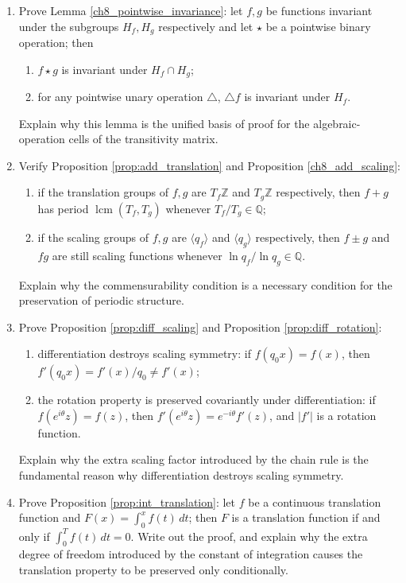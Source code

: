 \begin{enumerate}[leftmargin=3em, label=\textbf{Exercise \arabic*}]
    \item Prove Lemma \ref{ch8_pointwise_invariance}:
    let $f,g$ be functions invariant under the subgroups $H_f,H_g$ respectively
    and let $\star$ be a pointwise binary operation; then
    \begin{enumerate}[label=(\roman*)]
        \item $f\star g$ is invariant under $H_f\cap H_g$;
        \item for any pointwise unary operation $\triangle$, $\triangle f$ is invariant under $H_f$.
    \end{enumerate}
    Explain why this lemma is the unified basis of proof for the algebraic-operation cells of the transitivity matrix.

    \item Verify Proposition \ref{prop:add_translation} and Proposition \ref{ch8_add_scaling}:
    \begin{enumerate}[label=(\roman*)]
        \item if the translation groups of $f,g$ are $T_f\mathbb{Z}$ and $T_g\mathbb{Z}$ respectively,
              then $f+g$ has period $\operatorname{lcm}(T_f,T_g)$ whenever $T_f/T_g\in\mathbb{Q}$;
        \item if the scaling groups of $f,g$ are $\langle q_f\rangle$ and $\langle q_g\rangle$ respectively,
              then $f\pm g$ and $fg$ are still scaling functions whenever $\ln q_f/\ln q_g\in\mathbb{Q}$.
    \end{enumerate}
    Explain why the commensurability condition is a necessary condition for the preservation of periodic structure.

    \item Prove Proposition \ref{prop:diff_scaling} and Proposition \ref{prop:diff_rotation}:
    \begin{enumerate}[label=(\roman*)]
        \item differentiation destroys scaling symmetry: if $f(q_0x)=f(x)$, then
              $f'(q_0x)=f'(x)/q_0\neq f'(x)$;
        \item the rotation property is preserved covariantly under differentiation: if $f(e^{i\theta}z)=f(z)$, then
              $f'(e^{i\theta}z)=e^{-i\theta}f'(z)$, and $|f'|$ is a rotation function.
    \end{enumerate}
    Explain why the extra scaling factor introduced by the chain rule is the fundamental reason why differentiation destroys scaling symmetry.

    \item Prove Proposition \ref{prop:int_translation}:
    let $f$ be a continuous translation function and $F(x)=\int_0^x f(t)\,dt$;
    then $F$ is a translation function if and only if $\int_0^Tf(t)\,dt=0$.
    Write out the proof, and explain why the extra degree of freedom introduced by the constant of integration causes the translation property to be preserved only conditionally.


\end{enumerate}
